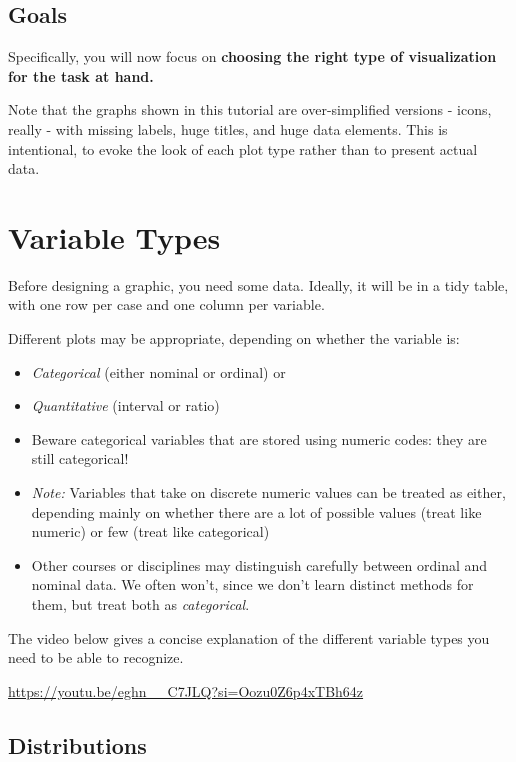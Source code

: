 \documentclass[
  letterpaper,
  DIV=11,
  numbers=noendperiod]{scrreprt}
\providecommand{\tightlist}{%
  \setlength{\itemsep}{0pt}\setlength{\parskip}{0pt}}\usepackage{longtable,booktabs,array}
\theoremstyle{remark}
\begin{document}
\section*{Goals}\label{goals}


Specifically, you will now focus on \textbf{choosing the right type of
visualization for the task at hand.}

Note that the graphs shown in this tutorial are over-simplified versions
- icons, really - with missing labels, huge titles, and huge data
elements. This is intentional, to evoke the look of each plot type
rather than to present actual data.

\chapter{Variable Types}\label{variable-types}

Before designing a graphic, you need some data. Ideally, it will be in a
tidy table, with one row per case and one column per variable.

Different plots may be appropriate, depending on whether the variable
is:

\begin{itemize}
\tightlist
\item
  \emph{Categorical} (either nominal or ordinal) or
\item
  \emph{Quantitative} (interval or ratio)
\item
  Beware categorical variables that are stored using numeric codes: they
  are still categorical!
\item
  \emph{Note:} Variables that take on discrete numeric values can be
  treated as either, depending mainly on whether there are a lot of
  possible values (treat like numeric) or few (treat like categorical)
\item
  Other courses or disciplines may distinguish carefully between ordinal
  and nominal data. We often won't, since we don't learn distinct
  methods for them, but treat both as \emph{categorical}.
\end{itemize}

The video below gives a concise explanation of the different variable
types you need to be able to recognize.

\url{https://youtu.be/eghn__C7JLQ?si=Oozu0Z6p4xTBh64z}

\section{Distributions}\label{distributions}
\end{document}
